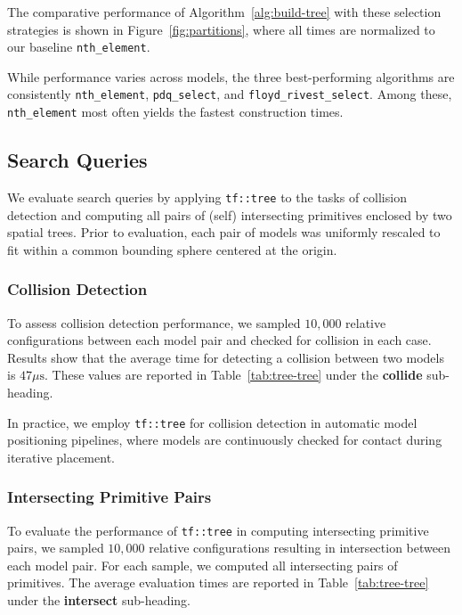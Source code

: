 The comparative performance of
Algorithm~\ref{alg:build-tree} with these selection strategies
is shown in Figure~\ref{fig:partitions}, where all times are
normalized to our baseline \texttt{nth\_element}.

While performance varies across models, the three best-performing
algorithms are consistently \texttt{nth\_element},
\texttt{pdq\_select}, and \texttt{floyd\_rivest\_select}.
Among these, \texttt{nth\_element} most often yields the
fastest construction times.



\subsection{Search Queries}

We evaluate search queries by applying \texttt{tf::tree} to the tasks
of collision detection and computing all pairs of (self) intersecting
primitives enclosed by two spatial trees. Prior to evaluation, each
pair of models was uniformly rescaled to fit within a common bounding
sphere centered at the origin. 


\subsubsection{Collision Detection}

To assess collision detection performance, we sampled $10{,}000$
relative configurations between each model pair and checked for
collision in each case. Results show that the average time for
detecting a collision between two models is $47 \mu\mathrm{s}$. These values
are reported in Table~\ref{tab:tree-tree} under the
\textbf{collide} sub-heading.

In practice, we employ \texttt{tf::tree} for collision detection in
automatic model positioning pipelines, where models are
continuously checked for contact during iterative placement.

\subsubsection{Intersecting Primitive Pairs}

To evaluate the performance of \texttt{tf::tree} in computing
intersecting primitive pairs, we sampled $10{,}000$ relative
configurations resulting in intersection between each model pair.
For each sample, we computed all intersecting pairs of primitives.
The average evaluation times are reported in
Table~\ref{tab:tree-tree} under the
\textbf{intersect} sub-heading.

